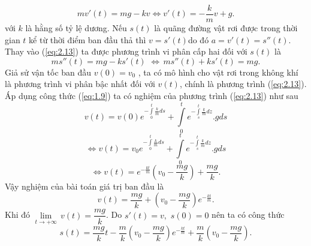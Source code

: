 \begin{equation}
	mv'(t)=mg-kv\Leftrightarrow v'(t)=-\dfrac{k}{m}v+g.
\label{eq:2.13}
\end{equation}
với $k$ là hằng số tỷ lệ dương.
Nếu $s(t)$ là quãng đường vật rơi được trong thời gian $t$ kể từ thời điểm ban đầu 
thả thì $v={s}'(t)$do đó $a={v}'(t)={s}''(t)$. Thay vào (\ref{eq:2.13}) ta được phương trình vi phân 
cấp hai đối với $s(t)$ là  
\begin{equation}
	m{s}''(t)=mg-k{s}'(t)\,\,\Leftrightarrow \,m{s}''(t)+k{s}'(t)=mg.
\label{eq:2.14}
\end{equation}
Giả sử vận tốc ban đầu $v(0)={{v}_{0}}$ , ta có mô hình cho vật rơi trong không khí là phương trình vi phân bậc nhất đối với $v(t)$, chính là phương trình (\ref{eq:2.13}). Áp dụng công thức (\ref{eq:1.9}) ta có nghiệm của phương trình (\ref{eq:2.13}) như sau
$$ v(t)=v(0){{e}^{-\int\limits_{0}^{t}{\frac{k}{m}ds}}}+\int\limits_{0}^{t}{{{e}^{-\int\limits_{s}^{t}{\frac{k}{m}dz}}}.gds} $$
	$$\Leftrightarrow v(t)={{v}_{0}}{{e}^{-\int\limits_{0}^{t}{\frac{k}{m}ds}}}+\int\limits_{0}^{t}{{{e}^{-\int\limits_{s}^{t}{\frac{k}{m}dz}}}.gds} $$
	$$\Leftrightarrow v(t)={{e}^{-\frac{kt}{m}}}\left( {{v}_{0}}-\frac{mg}{k} \right)+\dfrac{mg}{k}. $$
Vậy nghiệm của bài toán giá trị ban đầu là 
\begin{equation}
	v(t)=\dfrac{mg}{k}+({{v}_{0}}-\dfrac{mg}{k}){{e}^{-\frac{kt}{m}}}.
\label{eq:2.15}
\end{equation}
Khi đó $\underset{t\to +\infty }{\mathop{\lim }}\,v(t)=\dfrac{mg}{k}$. Do ${s}'(t)=v,\,\,s(0)=0$ nên ta có công thức        
\begin{equation}
	s(t)=\dfrac{mg}{k}t-\dfrac{m}{k}({{v}_{0}}-\dfrac{mg}{k}){{e}^{-\frac{kt}{m}}}+\dfrac{m}{k}({{v}_{0}}-\dfrac{mg}{k}).
\label{eq:2.16}
\end{equation}
